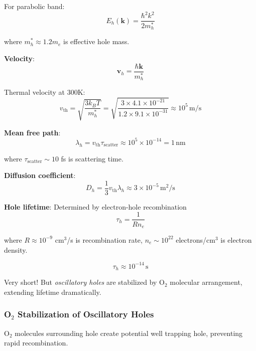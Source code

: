 \documentclass[11pt,onecolumn]{article}
\begin{document}
For parabolic band:
\begin{equation}
E_h(\mathbf{k}) = \frac{\hbar^2 k^2}{2m_h^*}
\end{equation}

where $m_h^* \approx 1.2 m_e$ is effective hole mass.

\textbf{Velocity}:
\begin{equation}
\mathbf{v}_h = \frac{\hbar\mathbf{k}}{m_h^*}
\end{equation}

Thermal velocity at 300K:
\begin{equation}
v_{\text{th}} = \sqrt{\frac{3k_B T}{m_h^*}} = \sqrt{\frac{3 \times 4.1 \times 10^{-21}}{1.2 \times 9.1 \times 10^{-31}}} \approx 10^5\,\text{m/s}
\end{equation}

\textbf{Mean free path}:
\begin{equation}
\lambda_h = v_{\text{th}} \tau_{\text{scatter}} \approx 10^5 \times 10^{-14} = 1\,\text{nm}
\end{equation}

where $\tau_{\text{scatter}} \sim 10$ fs is scattering time.

\textbf{Diffusion coefficient}:
\begin{equation}
D_h = \frac{1}{3}v_{\text{th}}\lambda_h \approx 3 \times 10^{-5}\,\text{m}^2\text{/s}
\end{equation}

\textbf{Hole lifetime}: Determined by electron-hole recombination
\begin{equation}
\tau_h = \frac{1}{R n_e}
\end{equation}

where $R \approx 10^{-9}$ cm$^3$/s is recombination rate, $n_e \sim 10^{22}$ electrons/cm$^3$ is electron density.

\begin{equation}
\tau_h \approx 10^{-14}\,\text{s}
\end{equation}

Very short! But \textit{oscillatory holes} are stabilized by O$_2$ molecular arrangement, extending lifetime dramatically.

\subsubsection{O$_2$ Stabilization of Oscillatory Holes}

O$_2$ molecules surrounding hole create potential well trapping hole, preventing rapid recombination.
\end{document}
